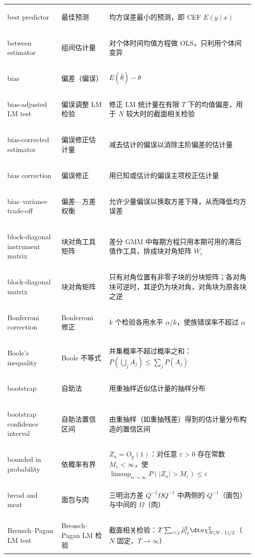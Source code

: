\begin{longtable}{@{}>{\bfseries\boldmath\raggedright\arraybackslash}p{4.6cm}>{\raggedright\arraybackslash}p{3.2cm}>{\raggedright\arraybackslash}p{\dimexpr\textwidth-7.8cm-4\tabcolsep\relax}@{}}
best predictor & 最佳预测 & 均方误差最小的预测，即 CEF $E(y\mid x)$ \\
between estimator & 组间估计量 & 对个体时间均值方程做 OLS，只利用个体间变异 \\
bias & 偏差（偏误） & $E(\hat\theta)-\theta$ \\
bias-adjusted LM test & 偏误调整 LM 检验 & 修正 LM 统计量在有限 $T$ 下的均值偏差，用于 $N$ 较大时的截面相关检验 \\
bias-corrected estimator & 偏误修正估计量 & 减去估计的偏误以消除主阶偏差的估计量 \\
bias correction & 偏误修正 & 用已知或估计的偏误主项校正估计量 \\
bias--variance trade-off & 偏差—方差权衡 & 允许少量偏误以换取方差下降，从而降低均方误差 \\
block-diagonal instrument matrix & 块对角工具矩阵 & 差分 GMM 中每期方程只用本期可用的滞后值作工具，排成块对角矩阵 $W_i$ \\
block-diagonal matrix & 块对角矩阵 & 只有对角位置有非零子块的分块矩阵；各对角块可逆时，其逆仍为块对角，对角块为原各块之逆 \\
Bonferroni correction & Bonferroni 修正 & $k$ 个检验各用水平 $\alpha/k$，使族错误率不超过 $\alpha$ \\
Boole's inequality & Boole 不等式 & 并集概率不超过概率之和：$P(\bigcup_jA_j)\le\sum_jP(A_j)$ \\
bootstrap & 自助法 & 用重抽样近似估计量的抽样分布 \\
bootstrap confidence interval & 自助法置信区间 & 由重抽样（如重抽残差）得到的估计量分布构造的置信区间 \\
bounded in probability & 依概率有界 & $Z_n=O_p(1)$：对任意 $\varepsilon>0$ 存在常数 $M_\varepsilon<\infty$，使 $\limsup_{n\to\infty}P(|Z_n|>M_\varepsilon)\le\varepsilon$ \\
bread and meat & 面包与肉 & 三明治方差 $Q^{-1}\Omega Q^{-1}$ 中两侧的 $Q^{-1}$（面包）与中间的 $\Omega$（肉） \\
Breusch--Pagan LM test & Breusch--Pagan LM 检验 & 截面相关检验：$T\sum_{i<j}\hat\rho_{ij}^2\dto\chi^2_{N(N-1)/2}$（$N$ 固定、$T\to\infty$） \\
\end{longtable}

\par{}\ifdim\dimexpr\pagegoal-\pagetotal\relax<16\baselineskip\newpage\fi
